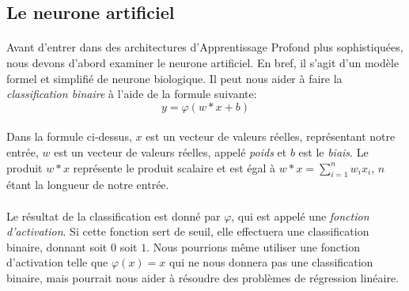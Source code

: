\subsection{Le neurone artificiel}
\paragraph{}
Avant d'entrer dans des architectures d'Apprentissage Profond plus sophistiquées, nous devons d'abord examiner le neurone artificiel.
En bref, il s'agit d'un modèle formel et simplifié de neurone biologique.
Il peut nous aider à faire la \emph{classification binaire} à l'aide de la formule suivante:
$$
y = \varphi (w * x + b)
$$

\paragraph{}
Dans la formule ci-dessus, $x$ est un vecteur de valeurs réelles, représentant notre entrée, $w$ est un vecteur de valeurs réelles, appelé \emph{poids} et $b$ est le \emph{biais}.
Le produit $w * x$ représente le produit scalaire et est égal à $w * x = \sum _{i=1}^{n}w_{i}x_{i}$, $n$ étant la longueur de notre entrée.

\paragraph{}
Le résultat de la classification est donné par $\varphi$, qui est appelé une \emph{fonction d'activation}.
Si cette fonction sert de seuil, elle effectuera une classification binaire, donnant soit $0$ soit $1$.
Nous pourrions même utiliser une fonction d'activation telle que $\varphi(x) = x$ qui ne nous donnera pas une classification binaire, mais pourrait nous aider à résoudre des problèmes de régression linéaire.


